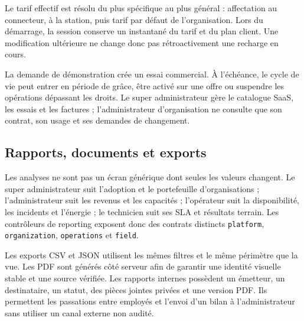 Le tarif effectif est résolu du plus spécifique au plus général : affectation au
connecteur, à la station, puis tarif par défaut de l'organisation. Lors du démarrage,
la session conserve un instantané du tarif et du plan client. Une modification
ultérieure ne change donc pas rétroactivement une recharge en cours.

La demande de démonstration crée un essai commercial. À l'échéance, le cycle de vie
peut entrer en période de grâce, être activé sur une offre ou suspendre les
opérations dépassant les droits. Le super administrateur gère le catalogue SaaS,
les essais et les factures ; l'administrateur d'organisation ne consulte que son
contrat, son usage et ses demandes de changement.

\subsection{Rapports, documents et exports}

Les analyses ne sont pas un écran générique dont seules les valeurs changent. Le
super administrateur suit l'adoption et le portefeuille d'organisations ;
l'administrateur suit les revenus et les capacités ; l'opérateur suit la
disponibilité, les incidents et l'énergie ; le technicien suit ses SLA et résultats
terrain. Les contrôleurs de reporting exposent donc des contrats distincts
\texttt{platform}, \texttt{organization}, \texttt{operations} et \texttt{field}.

Les exports CSV et JSON utilisent les mêmes filtres et le même périmètre que la vue.
Les PDF sont générés côté serveur afin de garantir une identité visuelle stable et
une source vérifiée. Les rapports internes possèdent un émetteur, un destinataire,
un statut, des pièces jointes privées et une version PDF. Ils permettent les
passations entre employés et l'envoi d'un bilan à l'administrateur sans utiliser un
canal externe non audité.
